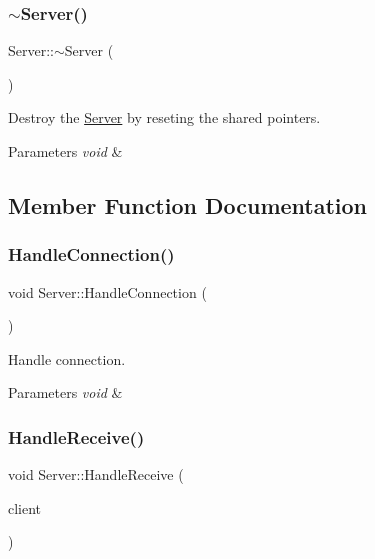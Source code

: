 \subsubsection{\texorpdfstring{$\sim$\+Server()}{~Server()}}
{\footnotesize\ttfamily Server\+::$\sim$\+Server (\begin{DoxyParamCaption}{ }\end{DoxyParamCaption})}



Destroy the \hyperlink{classns_1_1_server}{Server} by reseting the shared pointers. 


\begin{DoxyParams}{Parameters}
{\em void} & \\
\hline
\end{DoxyParams}


\subsection{Member Function Documentation}
\mbox{\label{classns_1_1_server_add5a181b9d70456b7e80cb258f32b8fd}} 
\subsubsection{\texorpdfstring{Handle\+Connection()}{HandleConnection()}}
{\footnotesize\ttfamily void Server\+::\+Handle\+Connection (\begin{DoxyParamCaption}{ }\end{DoxyParamCaption})}



Handle connection. 


\begin{DoxyParams}{Parameters}
{\em void} & \\
\hline
\end{DoxyParams}
\mbox{\label{classns_1_1_server_ad1d8a69bcfb01d6a13a05afe6a4de7cb}} 
\subsubsection{\texorpdfstring{Handle\+Receive()}{HandleReceive()}}
{\footnotesize\ttfamily void Server\+::\+Handle\+Receive (\begin{DoxyParamCaption}\item[{\hyperlink{class_server_client}{Server\+Client}}]{client }\end{DoxyParamCaption})}



